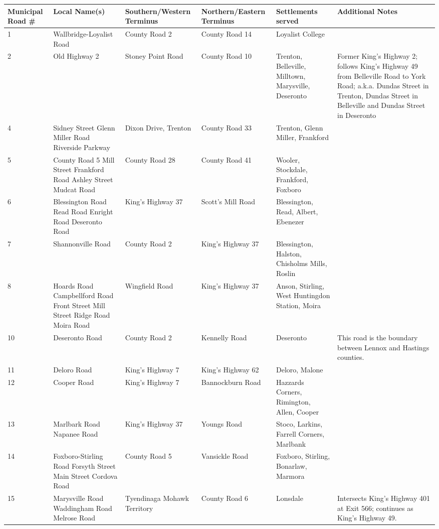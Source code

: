 \documentclass{article}
\begin{document}
\begin{tabular}{llllll}
\toprule
Municipal Road \# & Local Name(s) & Southern/Western Terminus & Northern/Eastern Terminus & Settlements served & Additional Notes \\
\midrule
1 & Wallbridge-Loyalist Road & County Road 2 & County Road 14 & Loyalist College &  \\
2 & Old Highway 2 & Stoney Point Road & County Road 10 & Trenton, Belleville, Milltown, Marysville, Deseronto & Former King's Highway 2; follows King's Highway 49 from Belleville Road to York Road; a.k.a. Dundas Street in Trenton, Dundas Street in Belleville and Dundas Street in Deseronto \\
4 & Sidney Street Glenn Miller Road Riverside Parkway & Dixon Drive, Trenton & County Road 33 & Trenton, Glenn Miller, Frankford &  \\
5 & County Road 5 Mill Street Frankford Road Ashley Street Mudcat Road & County Road 28 & County Road 41 & Wooler, Stockdale, Frankford, Foxboro &  \\
6 & Blessington Road Read Road Enright Road Deseronto Road & King's Highway 37 & Scott's Mill Road & Blessington, Read, Albert, Ebenezer &  \\
7 & Shannonville Road & County Road 2 & King's Highway 37 & Blessington, Halston, Chisholms Mills, Roslin &  \\
8 & Hoards Road Campbellford Road Front Street Mill Street Ridge Road Moira Road & Wingfield Road & King's Highway 37 & Anson, Stirling, West Huntingdon Station, Moira &  \\
10 & Deseronto Road & County Road 2 & Kennelly Road & Deseronto & This road is the boundary between Lennox and Hastings counties. \\
11 & Deloro Road & King's Highway 7 & King's Highway 62 & Deloro, Malone &  \\
12 & Cooper Road & King's Highway 7 & Bannockburn Road & Hazzards Corners, Rimington, Allen, Cooper &  \\
13 & Marlbark Road Napanee Road & King's Highway 37 & Youngs Road & Stoco, Larkins, Farrell Corners, Marlbank &  \\
14 & Foxboro-Stirling Road Forsyth Street Main Street Cordova Road & County Road 5 & Vansickle Road & Foxboro, Stirling, Bonarlaw, Marmora &  \\
15 & Marysville Road Waddingham Road Melrose Road & Tyendinaga Mohawk Territory & County Road 6 & Lonsdale & Intersects King's Highway 401 at Exit 566; continues as King's Highway 49. \\

\end{tabular}
\end{document}
